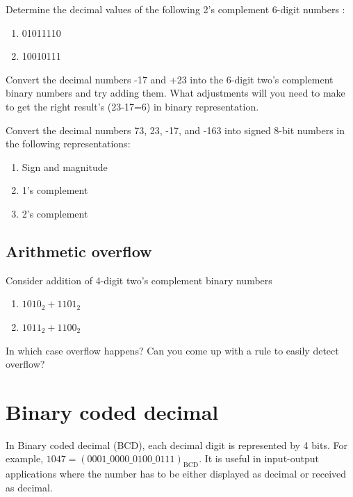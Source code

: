 \begin{prob}
  Determine the decimal values of the following 2’s complement 6-digit numbers :
  \begin{enumerate}
  \item 01011110
  \item 10010111
  \end{enumerate}
\end{prob}
\vspace{10em}

\begin{prob}
  Convert the decimal numbers -17 and +23 into the 6-digit two's complement binary numbers and try adding them. What adjustments will you need to make to get the right result's (23-17=6) in binary representation.
\end{prob}
\vspace{20em}

\begin{prob}
  Convert the decimal numbers 73, 23, -17, and -163 into signed 8-bit numbers in the
  following representations:
  \begin{enumerate}
    \item Sign and magnitude
    \item 1’s complement
    \item 2’s complement
  \end{enumerate}
\end{prob}
\vspace{20em}


\subsection{Arithmetic overflow}
\begin{prob}
  Consider addition of 4-digit two's complement binary numbers
  \begin{enumerate}
  \item $1010_2 + 1101_2$
  \item $1011_2 + 1100_2$
  \end{enumerate}
  In which case overflow happens? Can you come up with a rule to easily detect overflow?
\end{prob}
\vspace{20em}

\section{Binary coded decimal}
In Binary coded decimal (BCD), each decimal digit is represented by 4 bits. For
example, $1047 = (0001\_0000\_0100\_0111)_{\text{BCD}}$. It is useful in
input-output applications where the number has to be either displayed as decimal
or received as decimal.

